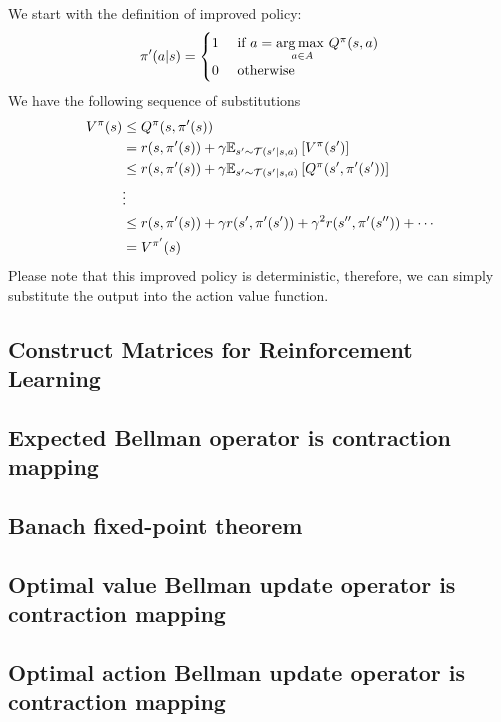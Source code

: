 We start with the definition of improved policy:
\begin{equation*}
    \pi'(a | s) = \begin{cases}
        1 &\text{ if } a = \underset{a \in A}{\arg\max \ } Q^\pi(s, a) \\
        0 &\text{ otherwise }
    \end{cases}
\end{equation*}
We have the following sequence of substitutions
\begin{equation*}
    \begin{aligned}
        V^{\pi}(s) &\le Q^{\pi}(s, \pi'(s)) \\
        &= r(s, \pi'(s)) + \gamma \mathbb{E}_{s' \sim \mathcal{T}(s' | s, a)}\left[ V^\pi(s') \right]  \\
        &\le r(s, \pi'(s)) + \gamma \mathbb{E}_{s' \sim \mathcal{T}(s' | s, a)}\left[ Q^{\pi}(s', \pi'(s')) \right]  \\
        &\vdots \\
        &\le r(s, \pi'(s)) + \gamma  r(s', \pi'(s')) + \gamma^2  r(s'', \pi'(s'')) + \cdots \\
        &= V^{\pi'}(s)
    \end{aligned}
\end{equation*}
Please note that this improved policy is deterministic, therefore, we can simply substitute the output into the action value function.

\subsection{Construct Matrices for Reinforcement Learning}
\label{appendix-2:metrics-rl}

\subsection{Expected Bellman operator is contraction mapping}
\label{appendix-2:expect-bellman-contract}

\subsection{Banach fixed-point theorem}
\label{appendix-2:fixed-point}

\subsection{Optimal value Bellman update operator is contraction mapping}
\label{appendix-2:optimal-val-bellman-contract}

\subsection{Optimal action Bellman update operator is contraction mapping}
\label{appendix-2:optimal-q-bellman-contract}